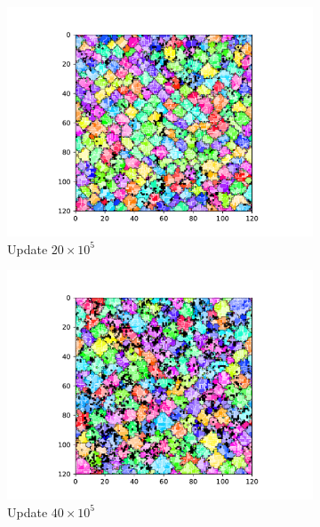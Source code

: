 \begin{figure}[t]
\begin{center}
\begin{subfigure}[b]{0.5\columnwidth}
  \includegraphics[width=\columnwidth,trim={2.5cm 0.5cm 2.5cm 1cm},clip]{img/ChannelMap_1011_update2000000}
  \caption{Update $20 \times 10^{5}$}
  \label{fig:ChannelMap_1011_update2000000}
\end{subfigure}%
\begin{subfigure}[b]{0.5\columnwidth}
  \includegraphics[width=\columnwidth,trim={2.5cm 0.5cm 2.5cm 1cm},clip]{img/ChannelMap_1011_update4000000}
  \caption{Update $40 \times 10^{5}$}
  \label{fig:ChannelMap_1011_update4000000}
\end{subfigure}
\begin{subfigure}[b]{0.5\columnwidth}

\end{subfigure}
\end{center}
\end{figure}

